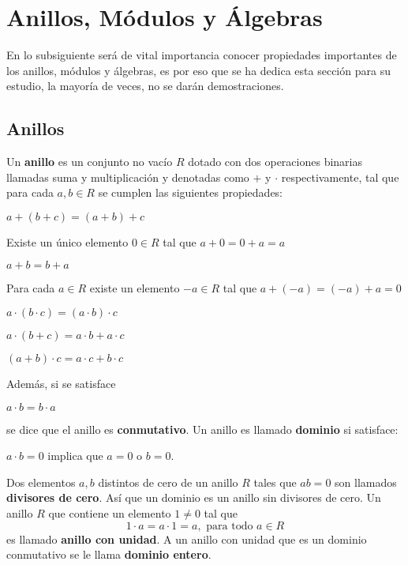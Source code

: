 \section{Anillos, Módulos y Álgebras}
En lo subsiguiente será de vital importancia conocer propiedades importantes de los anillos, módulos y álgebras, es por eso que se ha dedica esta sección para su estudio, la mayoría de veces, no se darán demostraciones.
\subsection{Anillos}
\begin{definicion}
Un \textbf{anillo} es un conjunto no vacío $R$ dotado con dos operaciones binarias llamadas suma y multiplicación y denotadas como $+$ y $\cdot$ respectivamente, tal que para cada $a,b\in R$ se cumplen las siguientes propiedades:
\begin{bulletList}
\item $a+(b+c) = (a+b)+c$
\item Existe un único elemento $0\in R$ tal que $a+0=0+a=a$
\item $a+b=b+a$
\item Para cada $a \in R$ existe un elemento $-a\in R$ tal que $a+(-a) = (-a)+a=0$
\item $a\cdot(b\cdot c) = (a\cdot b)\cdot c$
\item $a\cdot(b+c) = a\cdot b+ a\cdot c$
\item $(a+b)\cdot c= a\cdot c+b\cdot c $
\end{bulletList}
Además, si se satisface
\begin{bulletList}\addtocounter{ContadorLista}{7}
\item $a \cdot b = b\cdot a$
\end{bulletList}
se dice que el anillo es \textbf{conmutativo}.
Un anillo es llamado  \textbf{dominio} si satisface:
\begin{bulletList}\addtocounter{ContadorLista}{8}
\item $a\cdot b = 0$ implica que $a = 0$  o $b = 0$.
\end{bulletList}
\end{definicion}
Dos elementos $a,b$ distintos de cero de un anillo $R$ tales que $ab = 0$ son llamados \textbf{divisores de cero}. Así que un dominio es un anillo sin divisores de cero.
Un anillo $R$ que contiene un elemento $1\neq 0$ tal que \[ 1\cdot a = a \cdot 1 = a, \mbox{ para todo } a \in R \] es llamado \textbf{anillo con unidad}. A un anillo con unidad que es un dominio conmutativo se le llama \textbf{dominio entero}.

